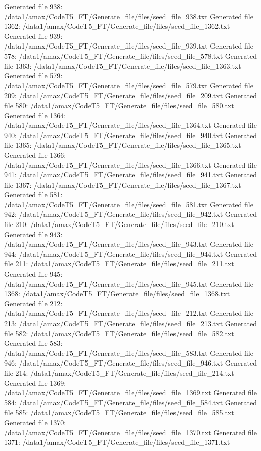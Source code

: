 Generated file 938: /data1/amax/CodeT5_FT/Generate_file/files/seed_file_938.txt
Generated file 1362: /data1/amax/CodeT5_FT/Generate_file/files/seed_file_1362.txt
Generated file 939: /data1/amax/CodeT5_FT/Generate_file/files/seed_file_939.txt
Generated file 578: /data1/amax/CodeT5_FT/Generate_file/files/seed_file_578.txt
Generated file 1363: /data1/amax/CodeT5_FT/Generate_file/files/seed_file_1363.txt
Generated file 579: /data1/amax/CodeT5_FT/Generate_file/files/seed_file_579.txt
Generated file 209: /data1/amax/CodeT5_FT/Generate_file/files/seed_file_209.txt
Generated file 580: /data1/amax/CodeT5_FT/Generate_file/files/seed_file_580.txt
Generated file 1364: /data1/amax/CodeT5_FT/Generate_file/files/seed_file_1364.txt
Generated file 940: /data1/amax/CodeT5_FT/Generate_file/files/seed_file_940.txt
Generated file 1365: /data1/amax/CodeT5_FT/Generate_file/files/seed_file_1365.txt
Generated file 1366: /data1/amax/CodeT5_FT/Generate_file/files/seed_file_1366.txt
Generated file 941: /data1/amax/CodeT5_FT/Generate_file/files/seed_file_941.txt
Generated file 1367: /data1/amax/CodeT5_FT/Generate_file/files/seed_file_1367.txt
Generated file 581: /data1/amax/CodeT5_FT/Generate_file/files/seed_file_581.txt
Generated file 942: /data1/amax/CodeT5_FT/Generate_file/files/seed_file_942.txt
Generated file 210: /data1/amax/CodeT5_FT/Generate_file/files/seed_file_210.txt
Generated file 943: /data1/amax/CodeT5_FT/Generate_file/files/seed_file_943.txt
Generated file 944: /data1/amax/CodeT5_FT/Generate_file/files/seed_file_944.txt
Generated file 211: /data1/amax/CodeT5_FT/Generate_file/files/seed_file_211.txt
Generated file 945: /data1/amax/CodeT5_FT/Generate_file/files/seed_file_945.txt
Generated file 1368: /data1/amax/CodeT5_FT/Generate_file/files/seed_file_1368.txt
Generated file 212: /data1/amax/CodeT5_FT/Generate_file/files/seed_file_212.txt
Generated file 213: /data1/amax/CodeT5_FT/Generate_file/files/seed_file_213.txt
Generated file 582: /data1/amax/CodeT5_FT/Generate_file/files/seed_file_582.txt
Generated file 583: /data1/amax/CodeT5_FT/Generate_file/files/seed_file_583.txt
Generated file 946: /data1/amax/CodeT5_FT/Generate_file/files/seed_file_946.txt
Generated file 214: /data1/amax/CodeT5_FT/Generate_file/files/seed_file_214.txt
Generated file 1369: /data1/amax/CodeT5_FT/Generate_file/files/seed_file_1369.txt
Generated file 584: /data1/amax/CodeT5_FT/Generate_file/files/seed_file_584.txt
Generated file 585: /data1/amax/CodeT5_FT/Generate_file/files/seed_file_585.txt
Generated file 1370: /data1/amax/CodeT5_FT/Generate_file/files/seed_file_1370.txt
Generated file 1371: /data1/amax/CodeT5_FT/Generate_file/files/seed_file_1371.txt
